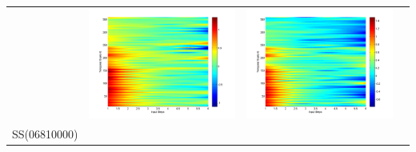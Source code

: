 \documentclass[11pt]{article}
\begin{document}
\begin{table}[H]
{\begin{tabular}{cccc}
&\begin{minipage}{.3\textwidth}\includegraphics[width=\linewidth]{resultgraph/11532500epdiff_former.png}\end{minipage}
&\begin{minipage}{.3\textwidth}\includegraphics[width=\linewidth]{resultgraph/11532500qdiff_former.png}\end{minipage}
\\
SS(06810000)

\end{tabular}}
\end{table}
\end{document}
